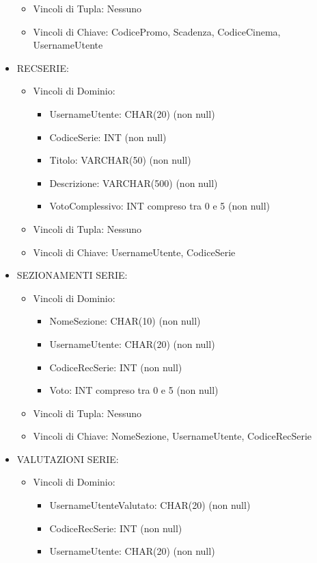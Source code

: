 \documentclass[a4paper,12pt]{report}
\begin{document}
\begin{itemize}
\begin{itemize}
\begin{itemize}
		\end{itemize}
		\item Vincoli di Tupla: Nessuno
		\item Vincoli di Chiave: CodicePromo, Scadenza, CodiceCinema, UsernameUtente
	\end{itemize}
	\item RECSERIE:
	\begin{itemize}
		\item Vincoli di Dominio:
		\begin{itemize}
			\item UsernameUtente: CHAR(20) (non null)
			\item CodiceSerie: INT (non null)
			\item Titolo: VARCHAR(50) (non null)
			\item Descrizione: VARCHAR(500) (non null)
			\item VotoComplessivo: INT compreso tra 0 e 5 (non null)
		\end{itemize}
		\item Vincoli di Tupla: Nessuno
		\item Vincoli di Chiave: UsernameUtente, CodiceSerie
	\end{itemize}
	\item SEZIONAMENTI SERIE:
	\begin{itemize}
		\item Vincoli di Dominio:
		\begin{itemize}
			\item NomeSezione: CHAR(10) (non null)
			\item UsernameUtente: CHAR(20) (non null)
			\item CodiceRecSerie: INT (non null)
			\item Voto: INT compreso tra 0 e 5 (non null)
		\end{itemize}
		\item Vincoli di Tupla: Nessuno
		\item Vincoli di Chiave: NomeSezione, UsernameUtente, CodiceRecSerie
	\end{itemize}
	\item VALUTAZIONI SERIE:
	\begin{itemize}
		\item Vincoli di Dominio:
		\begin{itemize}
			\item UsernameUtenteValutato: CHAR(20) (non null)
			\item CodiceRecSerie: INT (non null)
			\item UsernameUtente: CHAR(20) (non null)

\end{itemize}
\end{itemize}
\end{itemize}
\end{document}
